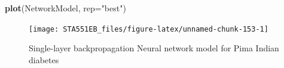 \documentclass[
]{book}
\newenvironment{Shaded}{\begin{snugshade}}{\end{snugshade}}
\newcommand{\AttributeTok}[1]{\textcolor[rgb]{0.13,0.29,0.53}{#1}}
\newcommand{\FunctionTok}[1]{\textcolor[rgb]{0.13,0.29,0.53}{\textbf{#1}}}
\newcommand{\NormalTok}[1]{#1}
\newcommand{\OtherTok}[1]{\textcolor[rgb]{0.56,0.35,0.01}{#1}}
\newcommand{\SpecialCharTok}[1]{\textcolor[rgb]{0.81,0.36,0.00}{\textbf{#1}}}
\newcommand{\StringTok}[1]{\textcolor[rgb]{0.31,0.60,0.02}{#1}}
\begin{document}
\begin{Shaded}
\begin{Highlighting}[]
\FunctionTok{plot}\NormalTok{(NetworkModel, }\AttributeTok{rep=}\StringTok{"best"}\NormalTok{)}
\end{Highlighting}
\end{Shaded}

\begin{figure}

{\centering \texttt{[image: STA551EB\_files/figure-latex/unnamed-chunk-153-1]} 

}

\caption{Single-layer backpropagation Neural network model for Pima Indian diabetes}\label{fig:unnamed-chunk-153}
\end{figure}

\begin{Shaded}
\end{Shaded}
\end{document}
